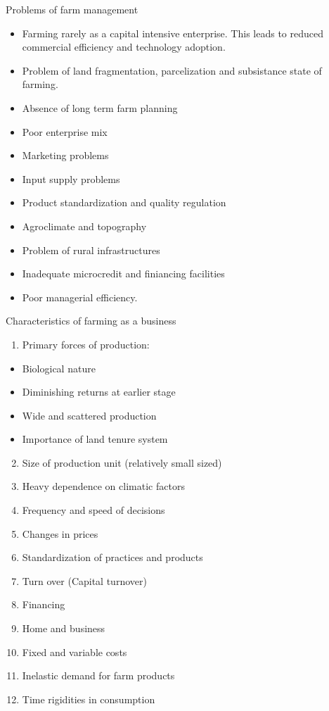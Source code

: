 \documentclass[12pt,ignorenonframetext,aspectratio=169]{beamer}
\providecommand{\tightlist}{%
  \setlength{\itemsep}{0pt}\setlength{\parskip}{0pt}}
\begin{document}
\begin{frame}{Problems of farm management}
\protect\hypertarget{problems-of-farm-management}{}
\begin{itemize}
\tightlist
\item
  Farming rarely as a capital intensive enterprise. This leads to
  reduced commercial efficiency and technology adoption.
\item
  Problem of land fragmentation, parcelization and subsistance state of
  farming.
\item
  Absence of long term farm planning
\item
  Poor enterprise mix
\item
  Marketing problems
\item
  Input supply problems
\item
  Product standardization and quality regulation
\item
  Agroclimate and topography
\item
  Problem of rural infrastructures
\item
  Inadequate microcredit and finiancing facilities
\item
  Poor managerial efficiency.
\end{itemize}
\end{frame}

\begin{frame}{Characteristics of farming as a business}
\protect\hypertarget{characteristics-of-farming-as-a-business}{}
\begin{enumerate}
\tightlist
\item
  Primary forces of production:
\end{enumerate}

\begin{itemize}
\tightlist
\item
  Biological nature
\item
  Diminishing returns at earlier stage
\item
  Wide and scattered production
\item
  Importance of land tenure system
\end{itemize}

\begin{enumerate}
\setcounter{enumi}{1}
\tightlist
\item
  Size of production unit (relatively small sized)
\item
  Heavy dependence on climatic factors
\item
  Frequency and speed of decisions
\item
  Changes in prices
\item
  Standardization of practices and products
\item
  Turn over (Capital turnover)
\item
  Financing
\item
  Home and business
\item
  Fixed and variable costs
\item
  Inelastic demand for farm products
\item
  Time rigidities in consumption
\end{enumerate}
\end{frame}
\end{document}
